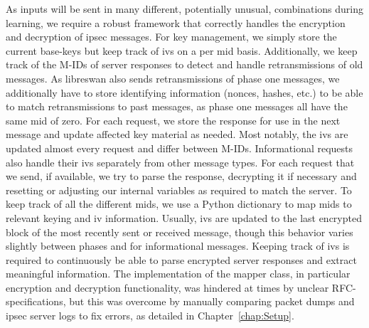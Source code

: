 As inputs will be sent in many different, potentially unusual, combinations during learning, we require a robust framework that correctly handles the encryption and decryption of \ac{ipsec} messages. For key management, we simply store the current base-keys but keep track of \acp{iv} on a per \ac{mid} basis. Additionally, we keep track of the M-IDs of server responses to detect and handle retransmissions of old messages. As libreswan also sends retransmissions of phase one messages, we additionally have to store identifying information (nonces, hashes, etc.) to be able to match retransmissions to past messages, as phase one messages all have the same \ac{mid} of zero.
For each request, we store the response for use in the next message and update affected key material as needed. Most notably, the \acp{iv} are updated almost every request and differ between M-IDs. Informational requests also handle their \acp{iv} separately from other message types. For each request that we send, if available, we try to parse the response, decrypting it if necessary and resetting or adjusting our internal variables as required to match the server. To keep track of all the different \acp{mid}, we use a Python dictionary to map \acp{mid} to relevant keying and \ac{iv} information. Usually, \acp{iv} are updated to the last encrypted block of the most recently sent or received message, though this behavior varies slightly between phases and for informational messages. Keeping track of \acp{iv} is required to continuously be able to parse encrypted server responses and extract meaningful information. The implementation of the mapper class, in particular encryption and decryption functionality, was hindered at times by unclear RFC-specifications, but this was overcome by manually comparing packet dumps and \ac{ipsec} server logs to fix errors, as detailed in Chapter~\ref{chap:Setup}.

